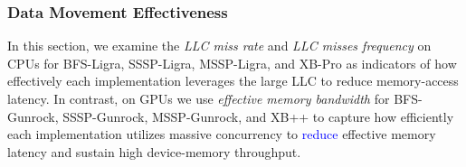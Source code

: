
\subsubsection{Data Movement Effectiveness}
In this section, we examine the \emph{LLC miss rate} and \emph{LLC misses frequency} on CPUs for BFS-Ligra, SSSP-Ligra, MSSP-Ligra, and XB-Pro as indicators of how effectively each implementation leverages the large LLC to reduce memory-access latency. 
In contrast, on GPUs we use \emph{effective memory bandwidth} for BFS-Gunrock, SSSP-Gunrock, MSSP-Gunrock, and XB++ to capture how efficiently each implementation utilizes massive concurrency to \textcolor{blue}{reduce} effective memory latency and sustain high device-memory throughput.



